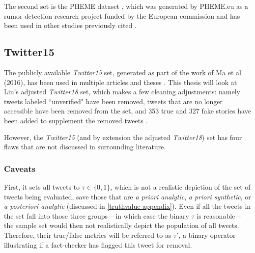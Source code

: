 \documentclass[preprint,review,12pt]{elsarticle}
\begin{document}
The second set is the PHEME dataset \cite{kochkina2018pheme}, which was generated by PHEME.eu as a rumor detection research project funded by the European commission and has been used in other studies previously cited \cite{zubiaga2016analysing}. 


\subsection{Twitter15}
 The publicly available \textit{Twitter15} set, generated as part of the work of Ma et al (2016), has been used in multiple articles and theses \citep{liu2018early,ma2017detect,ma2016detecting,khoo2020interpretable,liu2019early,huang2019deep}. This thesis will look at Liu's adjusted \textit{Twitter18} set, which makes a few cleaning adjustments: namely tweets labeled ``unverified" have been removed, tweets that are no longer accessible have been removed from the set, and 353 true and 327 fake stories have been added to supplement the removed tweets \citep{liu2019early}. 
 
 However, the \textit{Twitter15} (and by extension the adjusted \textit{Twitter18}) set has four flaws that are not discussed in surrounding literature. 
 
\subsubsection{Caveats}
First, it sets all tweets to $\tau \in \{0,1\}$, which is not a realistic depiction of the set of tweets being evaluated, save those that are \textit{a priori analytic}, \textit{a priori synthetic}, or \textit{a posteriori analytic} (discussed in \ref{truthvalue appendix}). Even if all the tweets in the set fall into those three groups -- in which case the binary $\tau$ is reasonable -- the sample set would then not realistically depict the population of all tweets. Therefore, their true/false metrics will be referred to as $\tau'$, a binary operator illustrating if a fact-checker has flagged this tweet for removal.
\end{document}
